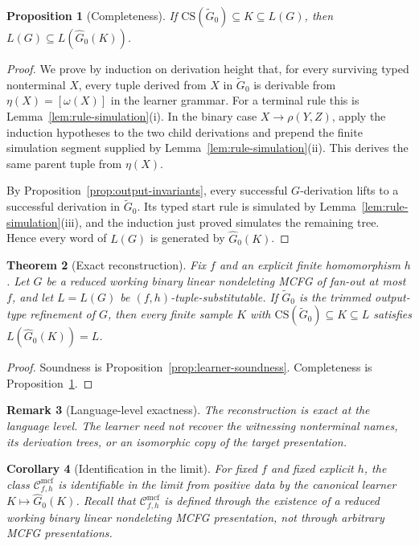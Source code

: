 \documentclass[11pt,a4paper]{article}
\newtheorem{theorem}{Theorem}[section]
\newtheorem{proposition}[theorem]{Proposition}
\newtheorem{corollary}[theorem]{Corollary}
\newtheorem{remark}[theorem]{Remark}
\theoremstyle{remark}
\newcommand{\CS}{\mathrm{CS}}
\newcommand{\Cmcf}[2]{\mathcal{C}^{\mathrm{mcf}}_{#1,#2}}
\begin{document}
\begin{proposition}[Completeness]
\label{prop:completeness}
If \(\CS(\widetilde G_0)\subseteq K\subseteq L(G)\), then
\(L(G)\subseteq L(\widehat G_0(K))\).
\end{proposition}

\begin{proof}
We prove by induction on derivation height that, for every surviving typed
nonterminal \(X\), every tuple derived from \(X\) in \(\widetilde G_0\) is
derivable from \(\eta(X)=[\omega(X)]\) in the learner grammar.  For a terminal
rule this is Lemma~\ref{lem:rule-simulation}(i).  In the binary case
\(X\to\rho(Y,Z)\), apply the induction hypotheses to the two child derivations
and prepend the finite simulation segment supplied by
Lemma~\ref{lem:rule-simulation}(ii).  This derives the same parent tuple from
\(\eta(X)\).

By Proposition~\ref{prop:output-invariants}, every successful \(G\)-derivation
lifts to a successful derivation in \(\widetilde G_0\).  Its typed start rule is
simulated by Lemma~\ref{lem:rule-simulation}(iii), and the induction just proved
simulates the remaining tree.  Hence every word of \(L(G)\) is generated by
\(\widehat G_0(K)\).
\end{proof}

\begin{theorem}[Exact reconstruction]
\label{thm:exact-reconstruction}
Fix \(f\) and an explicit finite homomorphism \(h\).  Let \(G\) be a reduced
working binary linear nondeleting MCFG of fan-out at most \(f\), and let
\(L=L(G)\) be \((f,h)\)-tuple-substitutable.  If \(\widetilde G_0\) is the
trimmed output-type refinement of \(G\), then every finite sample \(K\) with
\(\CS(\widetilde G_0)\subseteq K\subseteq L\) satisfies
\(L(\widehat G_0(K))=L\).
\end{theorem}

\begin{proof}
Soundness is Proposition~\ref{prop:learner-soundness}.  Completeness is
Proposition~\ref{prop:completeness}.
\end{proof}

\begin{remark}[Language-level exactness]
\label{rem:language-level-exactness}
The reconstruction is exact at the language level.  The learner need not
recover the witnessing nonterminal names, its derivation trees, or an
isomorphic copy of the target presentation.
\end{remark}

\begin{corollary}[Identification in the limit]
\label{cor:gold}
For fixed \(f\) and fixed explicit \(h\), the class \(\Cmcf{f}{h}\) is
identifiable in the limit from positive data by the canonical learner
\(K\mapsto\widehat G_0(K)\).  Recall that \(\Cmcf{f}{h}\) is defined through
the existence of a reduced working binary linear nondeleting MCFG presentation,
not through arbitrary MCFG presentations.
\end{corollary}
\end{document}
